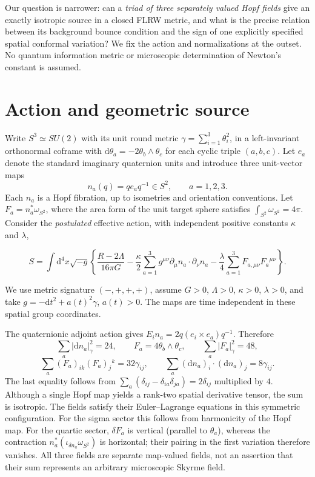 \documentclass[aps,prd,reprint,longbibliography,nofootinbib,superscriptaddress]{revtex4-2}
\newcommand{\dd}{\mathrm d}
\begin{document}
Our question is narrower: can a \emph{triad of three separately valued Hopf fields} give an exactly isotropic source in a closed FLRW metric, and what is the precise relation between its background bounce condition and the sign of one explicitly specified spatial conformal variation? We fix the action and normalizations at the outset. No quantum information metric or microscopic determination of Newton's constant is assumed.

\section{Action and geometric source}
Write $S^3\simeq SU(2)$ with its unit round metric $\gamma=\sum_{i=1}^3\theta_i^2$, in a left-invariant orthonormal coframe with $\dd\theta_a=-2\theta_b\wedge\theta_c$ for each cyclic triple $(a,b,c)$. Let $e_a$ denote the standard imaginary quaternion units and introduce three unit-vector maps
\begin{equation}\label{maps}
 n_a(q)=q e_a q^{-1}\in S^2,\qquad a=1,2,3.
\end{equation}
Each $n_a$ is a Hopf fibration, up to isometries and orientation conventions. Let $F_a=n_a^*\omega_{S^2}$, where the area form of the unit target sphere satisfies $\int_{S^2}\omega_{S^2}=4\pi$. Consider the \emph{postulated} effective action, with independent positive constants $\kappa$ and $\lambda$,
\begin{widetext}
\begin{equation}\label{action}
 S=\int\dd^4x\sqrt{-g}\left\{\frac{R-2\Lambda}{16\pi G}
 -\frac{\kappa}{2}\sum_{a=1}^3g^{\mu\nu}\partial_\mu n_a\cdot\partial_\nu n_a
 -\frac{\lambda}{4}\sum_{a=1}^3 F_{a,\mu\nu}F_a{}^{\mu\nu}\right\}.
\end{equation}
\end{widetext}
We use metric signature $(-,+,+,+)$, assume $G>0$, $\Lambda>0$, $\kappa>0$, $\lambda>0$, and take $g=-\dd t^2+a(t)^2\gamma$, $a(t)>0$. The maps are time independent in these spatial group coordinates.

The quaternionic adjoint action gives $E_i n_a=2q(e_i\times e_a)q^{-1}$. Therefore
\begin{equation}\label{isotropy}
 \sum_a|\dd n_a|_\gamma^2=24,\qquad
 F_a=4\theta_b\wedge\theta_c,\qquad
 \sum_a|F_a|_\gamma^2=48,
\end{equation}
\begin{equation}\label{tensorid}
 \sum_a(F_a)_{ik}(F_a)_j{}^k=32\gamma_{ij},\qquad
 \sum_a(\dd n_a)_i\cdot(\dd n_a)_j=8\gamma_{ij}.
\end{equation}
The last equality follows from $\sum_a(\delta_{ij}-\delta_{ia}\delta_{ja})=2\delta_{ij}$ multiplied by $4$. Although a single Hopf map yields a rank-two spatial derivative tensor, the sum is isotropic. The fields satisfy their Euler--Lagrange equations in this symmetric configuration. For the sigma sector this follows from harmonicity of the Hopf map. For the quartic sector, $\delta F_a$ is vertical (parallel to $\theta_a$), whereas the contraction $n_a^*(\iota_{\delta n_a}\omega_{S^2})$ is horizontal; their pairing in the first variation therefore vanishes. All three fields are separate map-valued fields, not an assertion that their sum represents an arbitrary microscopic Skyrme field.
\end{document}

